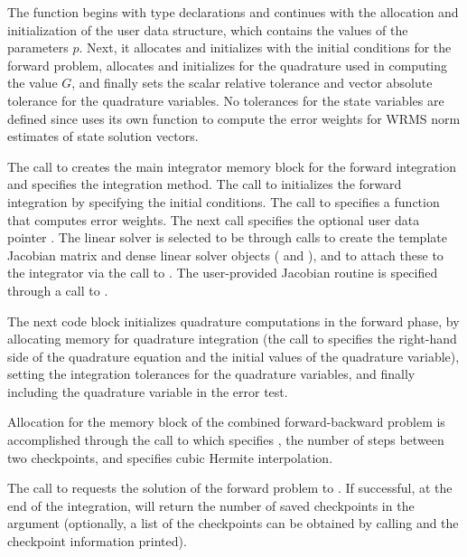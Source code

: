 The  function begins with type declarations and continues with the
allocation and initialization of the user data structure, which contains the values 
of the parameters $p$. Next, it allocates and
initializes  with the initial conditions for the forward problem, allocates and 
initializes  for the quadrature used in computing the value $G$, and finally
sets the scalar relative tolerance  and vector absolute tolerance
 for the quadrature variables.
No tolerances for the state variables are defined since 
uses its own function to compute the error weights for WRMS norm
estimates of state solution vectors.

The call to  creates the main integrator memory block for the 
forward integration and specifies the  integration method. 
The call to  initializes the forward integration by specifying the 
initial conditions.
The call to  specifies a function that computes error weights.
The next call specifies the optional user data pointer .
The linear solver is selected to be {\sunlinsoldense} through calls to
create the template Jacobian matrix and dense linear solver objects
( and ), and to attach these
to the {\cvodes} integrator via the call to
. The user-provided Jacobian routine 
is specified through a call to . 

The next code block initializes quadrature computations in the forward phase, by
allocating {\cvodes} memory for quadrature integration (the call to
 specifies the right-hand side  of the quadrature
equation and the initial values of the quadrature variable),
setting the integration tolerances for the quadrature variables, and finally
including the quadrature variable in the error test.

Allocation for the memory block of the combined forward-backward
problem is accomplished through the call to  which
specifies , the number of steps between two
checkpoints, and specifies cubic Hermite interpolation.

The call to  requests the solution of the forward problem to .
If successful, at the end of the integration,  will return the number
of saved checkpoints in the argument  (optionally, a list of the
checkpoints can be obtained by calling  and the
checkpoint information printed).


